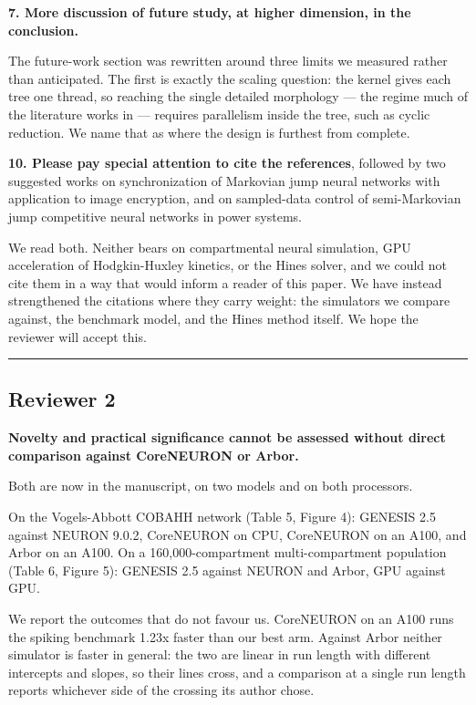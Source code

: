 \documentclass[11pt,a4paper]{article}
\begin{document}
\textbf{7. More discussion of future study, at higher dimension, in the conclusion.}

The future-work section was rewritten around three limits we measured rather than anticipated. The first is exactly the scaling question: the kernel gives each tree one thread, so reaching the single detailed morphology --- the regime much of the literature works in --- requires parallelism inside the tree, such as cyclic reduction. We name that as where the design is furthest from complete.

\textbf{10. Please pay special attention to cite the references}, followed by two suggested works on synchronization of Markovian jump neural networks with application to image encryption, and on sampled-data control of semi-Markovian jump competitive neural networks in power systems.

We read both. Neither bears on compartmental neural simulation, GPU acceleration of Hodgkin-Huxley kinetics, or the Hines solver, and we could not cite them in a way that would inform a reader of this paper. We have instead strengthened the citations where they carry weight: the simulators we compare against, the benchmark model, and the Hines method itself. We hope the reviewer will accept this.

\medskip\hrule\medskip

\subsection*{Reviewer 2}

\textbf{Novelty and practical significance cannot be assessed without direct comparison against CoreNEURON or Arbor.}

Both are now in the manuscript, on two models and on both processors.

On the Vogels-Abbott COBAHH network (Table 5, Figure 4): GENESIS 2.5 against NEURON 9.0.2, CoreNEURON on CPU, CoreNEURON on an A100, and Arbor on an A100. On a 160,000-compartment multi-compartment population (Table 6, Figure 5): GENESIS 2.5 against NEURON and Arbor, GPU against GPU.

We report the outcomes that do not favour us. CoreNEURON on an A100 runs the spiking benchmark 1.23x faster than our best arm. Against Arbor neither simulator is faster in general: the two are linear in run length with different intercepts and slopes, so their lines cross, and a comparison at a single run length reports whichever side of the crossing its author chose.
\end{document}
